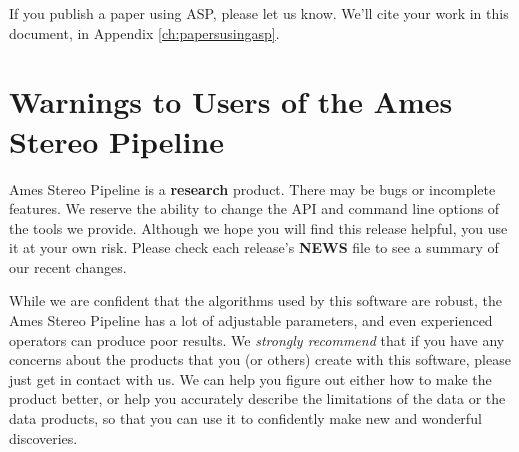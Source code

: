 If you publish a paper using ASP, please let us know. We'll cite your
work in this document, in Appendix \ref{ch:papersusingasp}.

\section{Warnings to Users of the Ames Stereo Pipeline}

Ames Stereo Pipeline is a {\bf research} product. There may be bugs or
incomplete features. We reserve the ability to change the API and
command line options of the tools we provide. Although we hope you will
find this release helpful, you use it at your own risk. Please check
each release's {\bf NEWS} file to see a summary of our recent changes.

While we are confident that the algorithms used by this software are
robust, the Ames Stereo Pipeline has a lot of adjustable parameters, and 
even experienced operators can produce poor results.  We {\it
strongly recommend} that if you have any concerns about the products that
you (or others) create with this software, please just get in contact with us.
We can help you figure out either how to make the product better, or help you
accurately describe the limitations of the data or the data products, so that 
you can use it to confidently make new and wonderful discoveries.

